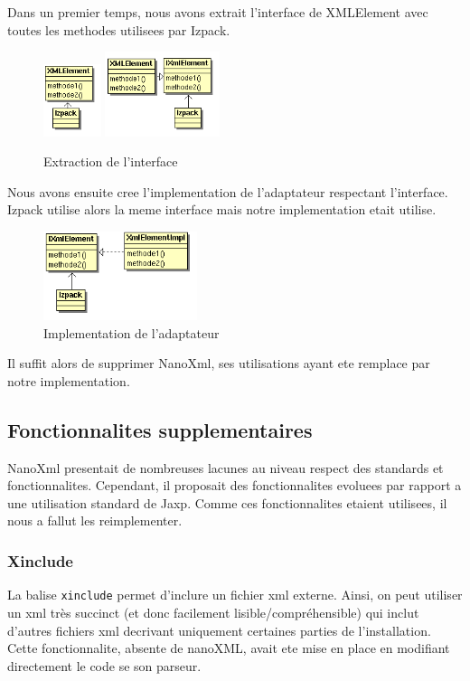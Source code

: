 Dans un premier temps, nous avons extrait l'interface de XMLElement avec toutes les methodes utilisees par Izpack.
\begin{figure}[H]
	\centering
	\includegraphics[width=0.15\textwidth]{../image/sol_casInitial.png}
	\hfil
	\includegraphics[width=0.3\textwidth]{../image/sol_extractionInterface.png}
	\caption{Extraction de l'interface}
\end{figure}
Nous avons ensuite cree l'implementation de l'adaptateur respectant l'interface. Izpack utilise alors la meme interface mais notre implementation etait utilise. 
\begin{figure}[H]
	\centering
	\includegraphics[width=0.4\textwidth]{../image/sol_implementation.png}
	\caption{Implementation de l'adaptateur}
\end{figure}
Il suffit alors de supprimer NanoXml, ses utilisations ayant ete remplace par notre implementation.
\subsection{Fonctionnalites supplementaires}
NanoXml presentait de nombreuses lacunes au niveau respect des standards et fonctionnalites. Cependant, il proposait des fonctionnalites evoluees par rapport a une utilisation standard de Jaxp. Comme ces fonctionnalites etaient utilisees, il nous a fallut les reimplementer.
\subsubsection{Xinclude}
La balise \verb|xinclude| permet d'inclure un fichier xml externe. Ainsi, on peut utiliser un xml très succinct (et donc facilement lisible/compréhensible) qui inclut d'autres fichiers xml decrivant uniquement certaines parties de l'installation. Cette fonctionnalite, absente de nanoXML, avait ete mise en place en modifiant directement le code se son parseur.

